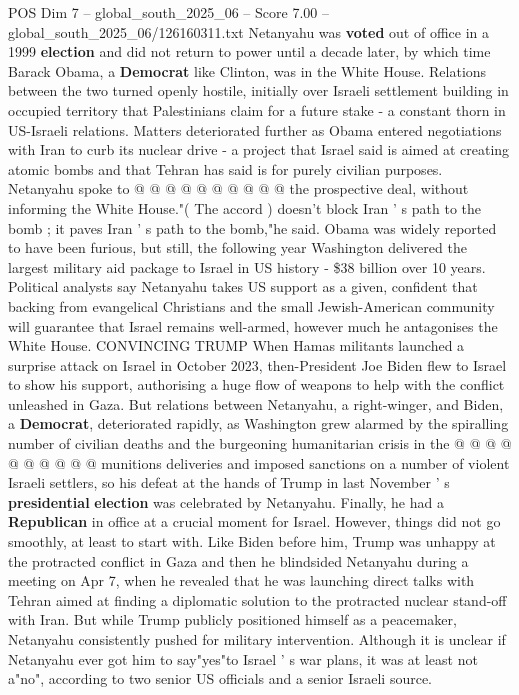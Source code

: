 \begin{textsample}{POS Dim 7 – global\_south\_2025\_06 – Score 7.00 – global\_south\_2025\_06/126160311.txt}
Netanyahu was \textbf{voted} out of office in a 1999 \textbf{election} and did not return to power until a decade later, by which time Barack Obama, a \textbf{Democrat} like Clinton, was in the White House.
Relations between the two turned openly hostile, initially over Israeli settlement building in occupied territory that Palestinians claim for a future stake - a constant thorn in US-Israeli relations.
Matters deteriorated further as Obama entered negotiations with Iran to curb its nuclear drive - a project that Israel said is aimed at creating atomic bombs and that Tehran has said is for purely civilian purposes.
Netanyahu spoke to @ @ @ @ @ @ @ @ @ @ the prospective deal, without informing the White House."( The accord ) doesn't block Iran ' s path to the bomb ; it paves Iran ' s path to the bomb,"he said.
Obama was widely reported to have been furious, but still, the following year Washington delivered the largest military aid package to Israel in US history - \$38 billion over 10 years.
Political analysts say Netanyahu takes US support as a given, confident that backing from evangelical Christians and the small Jewish-American community will guarantee that Israel remains well-armed, however much he antagonises the White House.
CONVINCING TRUMP When Hamas militants launched a surprise attack on Israel in October 2023, then-President Joe Biden flew to Israel to show his support, authorising a huge flow of weapons to help with the conflict unleashed in Gaza.
But relations between Netanyahu, a right-winger, and Biden, a \textbf{Democrat}, deteriorated rapidly, as Washington grew alarmed by the spiralling number of civilian deaths and the burgeoning humanitarian crisis in the @ @ @ @ @ @ @ @ @ @ munitions deliveries and imposed sanctions on a number of violent Israeli settlers, so his defeat at the hands of Trump in last November ' s \textbf{presidential} \textbf{election} was celebrated by Netanyahu.
Finally, he had a \textbf{Republican} in office at a crucial moment for Israel.
However, things did not go smoothly, at least to start with.
Like Biden before him, Trump was unhappy at the protracted conflict in Gaza and then he blindsided Netanyahu during a meeting on Apr 7, when he revealed that he was launching direct talks with Tehran aimed at finding a diplomatic solution to the protracted nuclear stand-off with Iran.
But while Trump publicly positioned himself as a peacemaker, Netanyahu consistently pushed for military intervention.
Although it is unclear if Netanyahu ever got him to say"yes"to Israel ' s war plans, it was at least not a"no", according to two senior US officials and a senior Israeli source.

\end{textsample}
